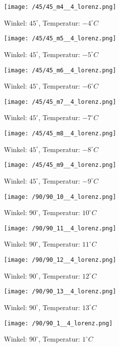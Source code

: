 \clearpage
\begin{figure}[c]
\centering
\texttt{[image: /45/45\_m4\_\_4\_lorenz.png]}
\caption{Winkel: $ 45^\circ$, Temperatur: $ -4^\circ C$}
\end{figure}
\begin{figure}[c]
\centering
\texttt{[image: /45/45\_m5\_\_4\_lorenz.png]}
\caption{Winkel: $ 45^\circ$, Temperatur: $ -5^\circ C$}
\end{figure}
\clearpage
\begin{figure}[c]
\centering
\texttt{[image: /45/45\_m6\_\_4\_lorenz.png]}
\caption{Winkel: $ 45^\circ$, Temperatur: $ -6^\circ C$}
\end{figure}
\begin{figure}[c]
\centering
\texttt{[image: /45/45\_m7\_\_4\_lorenz.png]}
\caption{Winkel: $ 45^\circ$, Temperatur: $ -7^\circ C$}
\end{figure}
\clearpage
\begin{figure}[c]
\centering
\texttt{[image: /45/45\_m8\_\_4\_lorenz.png]}
\caption{Winkel: $ 45^\circ$, Temperatur: $ -8^\circ C$}
\end{figure}
\begin{figure}[c]
\centering
\texttt{[image: /45/45\_m9\_\_4\_lorenz.png]}
\caption{Winkel: $ 45^\circ$, Temperatur: $ -9^\circ C$}
\end{figure}
\clearpage
\begin{figure}[c]
\centering
\texttt{[image: /90/90\_10\_\_4\_lorenz.png]}
\caption{Winkel: $ 90^\circ$, Temperatur: $ 10^\circ C$}
\end{figure}
\begin{figure}[c]
\centering
\texttt{[image: /90/90\_11\_\_4\_lorenz.png]}
\caption{Winkel: $ 90^\circ$, Temperatur: $ 11^\circ C$}
\end{figure}
\clearpage
\begin{figure}[c]
\centering
\texttt{[image: /90/90\_12\_\_4\_lorenz.png]}
\caption{Winkel: $ 90^\circ$, Temperatur: $ 12^\circ C$}
\end{figure}
\begin{figure}[c]
\centering
\texttt{[image: /90/90\_13\_\_4\_lorenz.png]}
\caption{Winkel: $ 90^\circ$, Temperatur: $ 13^\circ C$}
\end{figure}
\clearpage
\begin{figure}[c]
\centering
\texttt{[image: /90/90\_1\_\_4\_lorenz.png]}
\caption{Winkel: $ 90^\circ$, Temperatur: $ 1^\circ C$}
\end{figure}
